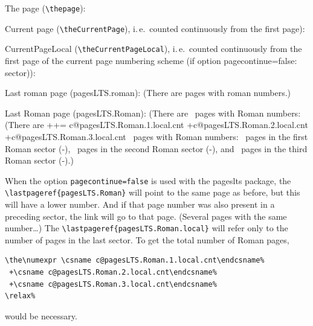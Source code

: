 \documentclass[british]{article}[2024/06/29]%
\begin{document}
The page (\verb|\thepage|): \thepage \bigskip

Current page (\verb|\theCurrentPage|),
i.\,e.~counted continuously from the first page): \theCurrentPage \bigskip

CurrentPageLocal (\verb|\theCurrentPageLocal|),
i.\,e.~counted continuously from the first page of the
current page numbering scheme (if option pagecontinue=false: sector)): \theCurrentPageLocal \bigskip

Last roman page (pagesLTS.roman): 
(There are  pages with roman numbers.)\bigskip

Last Roman page (pagesLTS.Roman): %
\makeatletter%
\ifpagesLTS@pagecontinue%
  (There are ~pages with Roman numbers:\newline
\else%
  (There are %
  ++=%
   \the\numexpr%
    \csname c@pagesLTS.Roman.1.local.cnt\endcsname%
   +\csname c@pagesLTS.Roman.2.local.cnt\endcsname%
   +\csname c@pagesLTS.Roman.3.local.cnt\endcsname%
   \relax~pages with Roman numbers:\newline
\fi%
\makeatother%
~pages in the first Roman sector
(\pageref{Roman}{\hskip3em }-),\newline
{}~pages in the second Roman sector
(\pageref{Roman2}{\hskip3em }-), and\newline
{}~pages in the third Roman sector
(\pageref{Roman3}{\hskip3em }-).)\bigskip

When the option \texttt{pagecontinue=false} is used with the
\textsf{pageslts} package, the \verb|\lastpageref{pagesLTS.Roman}| will
point to the same page as before, but this will have a lower number.
And if that page number was also present in a preceding sector,
the link will go to that page. (Several pages with the same number\ldots)\newline
The \verb|\lastpageref{pagesLTS.Roman.local}| will refer only to the number
of pages in the last sector. To get the total number of Roman pages, %
\begin{verbatim}
\the\numexpr \csname c@pagesLTS.Roman.1.local.cnt\endcsname%
 +\csname c@pagesLTS.Roman.2.local.cnt\endcsname%
 +\csname c@pagesLTS.Roman.3.local.cnt\endcsname%
\relax%
\end{verbatim}%
would be necessary.
\pagebreak
\end{document}
